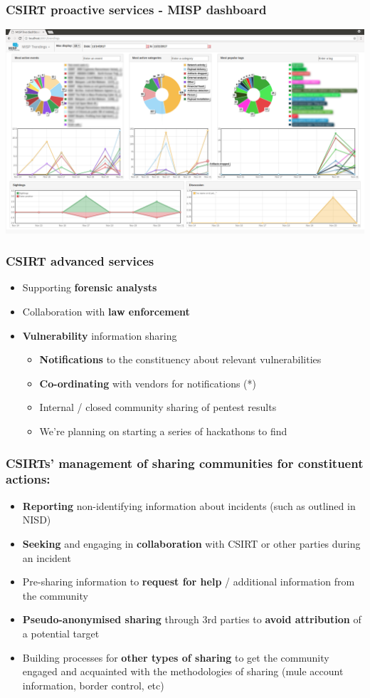 \begin{frame}
\frametitle{CSIRT proactive services - MISP dashboard}
\includegraphics[scale=0.18]{screenshots/dashboard-trendings.png}
\end{frame}

\begin{frame}
\frametitle{CSIRT advanced services}
\begin{itemize}
	\item Supporting {\bf forensic analysts}
	\item Collaboration with {\bf law enforcement}
	\item {\bf Vulnerability} information sharing
	\begin{itemize}
		\item {\bf Notifications} to the constituency about relevant vulnerabilities
		\item {\bf Co-ordinating} with vendors for notifications (*)
		\item Internal / closed community sharing of pentest results
		\item We're planning on starting a series of hackathons to find
	\end{itemize}
\end{itemize}
\end{frame}


\begin{frame}
\frametitle{CSIRTs' management of sharing communities for constituent actions:}
\begin{itemize}
	\item {\bf Reporting} non-identifying information about incidents (such as outlined in NISD)
	\item {\bf Seeking} and engaging in {\bf collaboration} with CSIRT or other parties during an incident
	\item Pre-sharing information to {\bf request for help} / additional information from the community
	\item {\bf Pseudo-anonymised sharing} through 3rd parties to {\bf avoid attribution} of a potential target
	\item Building processes for {\bf other types of sharing} to get the community engaged and acquainted with the methodologies of sharing (mule account information, border control, etc)
\end{itemize}
\end{frame}


